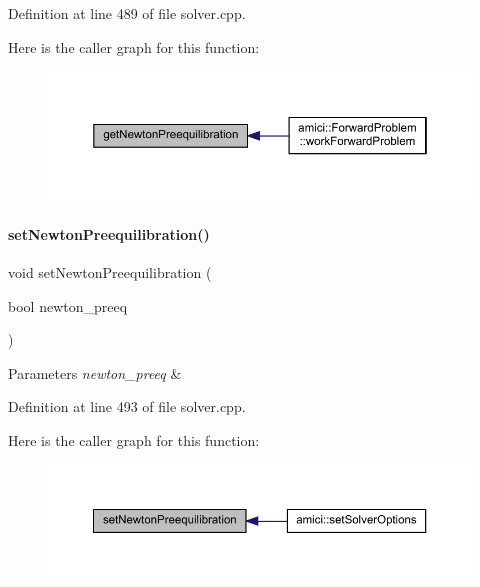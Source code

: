 Definition at line 489 of file solver.\+cpp.

Here is the caller graph for this function\+:
\nopagebreak
\begin{figure}[H]
\begin{center}
\leavevmode
\includegraphics[width=350pt]{classamici_1_1_solver_a75aabe2e004edaba96db48b0abd3fc6f_icgraph}
\end{center}
\end{figure}
\mbox{\label{classamici_1_1_solver_a8e71a26a59a4c3c03b362a72079377f2}} 
\paragraph{\texorpdfstring{set\+Newton\+Preequilibration()}{setNewtonPreequilibration()}}
{\footnotesize\ttfamily void set\+Newton\+Preequilibration (\begin{DoxyParamCaption}\item[{bool}]{newton\+\_\+preeq }\end{DoxyParamCaption})}


\begin{DoxyParams}{Parameters}
{\em newton\+\_\+preeq} & \\
\hline
\end{DoxyParams}


Definition at line 493 of file solver.\+cpp.

Here is the caller graph for this function\+:
\nopagebreak
\begin{figure}[H]
\begin{center}
\leavevmode
\includegraphics[width=350pt]{classamici_1_1_solver_a8e71a26a59a4c3c03b362a72079377f2_icgraph}
\end{center}
\end{figure}
\mbox{\label{classamici_1_1_solver_a874c929a78d0e2af11c62ba958e1b3d1}} 

